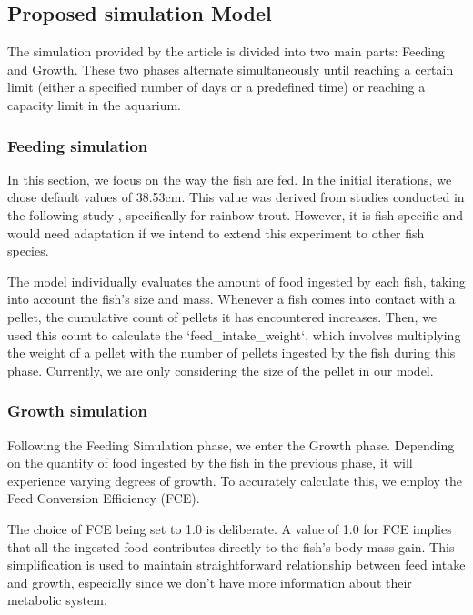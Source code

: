 \documentclass[9pt]{article}
\begin{document}
\subsection{Proposed simulation Model}

The simulation provided by the article is divided into two main parts: Feeding and Growth. These two phases alternate simultaneously until reaching a certain limit (either a specified number of days or a predefined time) or reaching a capacity limit in the aquarium.

\subsubsection{Feeding simulation}

In this section, we focus on the way the fish are fed. In the initial iterations, we chose default values of 38.53cm. This value was derived from studies conducted in the following study \cite{morales1994effects}, specifically for rainbow trout. However, it is fish-specific and would need adaptation if we intend to extend this experiment to other fish species.

The model individually evaluates the amount of food ingested by each fish, taking into account the fish's size and mass. 
Whenever a fish comes into contact with a pellet, the cumulative count of pellets it has encountered increases. Then, we used this count to calculate the `feed\_intake\_weight`, which involves multiplying the weight of a pellet with the number of pellets ingested by the fish during this phase. Currently, we are only considering the size of the pellet in our model.

\subsubsection{Growth simulation}

Following the Feeding Simulation phase, we enter the Growth phase. Depending on the quantity of food ingested by the fish in the previous phase, it will experience varying degrees of growth. To accurately calculate this, we employ the Feed Conversion Efficiency (FCE).

The choice of FCE being set to 1.0 is deliberate. A value of 1.0 for FCE implies that all the ingested food contributes directly to the fish's body mass gain. This simplification is used to maintain straightforward relationship between feed intake and growth, especially since we don't have more information about their metabolic system. 
\end{document}
